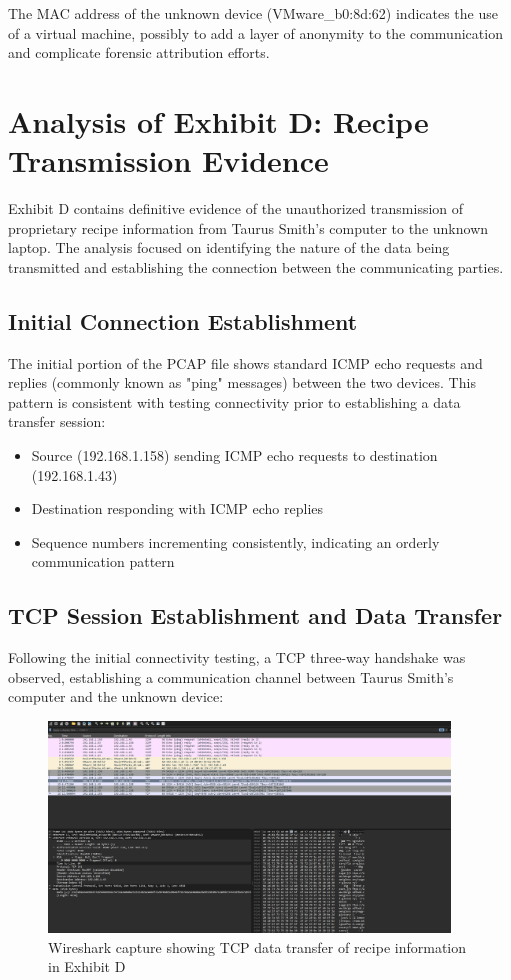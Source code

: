 The MAC address of the unknown device (VMware\_b0:8d:62) indicates the use of a virtual machine, possibly to add a layer of anonymity to the communication and complicate forensic attribution efforts.

\section{Analysis of Exhibit D: Recipe Transmission Evidence}

Exhibit D contains definitive evidence of the unauthorized transmission of proprietary recipe information from Taurus Smith's computer to the unknown laptop. The analysis focused on identifying the nature of the data being transmitted and establishing the connection between the communicating parties.

\subsection{Initial Connection Establishment}
The initial portion of the PCAP file shows standard ICMP echo requests and replies (commonly known as "ping" messages) between the two devices. This pattern is consistent with testing connectivity prior to establishing a data transfer session:

\begin{itemize}
    \item Source (192.168.1.158) sending ICMP echo requests to destination (192.168.1.43)
    \item Destination responding with ICMP echo replies
    \item Sequence numbers incrementing consistently, indicating an orderly communication pattern
\end{itemize}

\subsection{TCP Session Establishment and Data Transfer}
Following the initial connectivity testing, a TCP three-way handshake was observed, establishing a communication channel between Taurus Smith's computer and the unknown device:

\begin{figure}[h]
    \centering
    \includegraphics[width=0.95\textwidth]{images/Network_Analysis/ExhibitD_pcap.png}
    \caption{Wireshark capture showing TCP data transfer of recipe information in Exhibit D}
    \label{fig:exhibit_d_recipe}
\end{figure}

